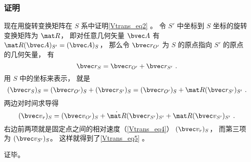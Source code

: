 \subsubsection{证明}
现在用旋转变换矩阵在 $S$ 系中证明\autoref{Vtrans_eq2} 。 令 $S'$ 中坐标到 $S$ 坐标的旋转变换矩阵为 $\mat R$， 即对任意几何矢量 $\bvec A$ 有 $\mat R (\bvec A)_{S'} = (\bvec A)_S$， 那么令 $\bvec r_{O'}$ 为 $S$ 的原点指向 $S'$ 的原点的几何矢量， 有
\begin{equation}
\bvec r_S = \bvec r_{O'} + \bvec r_{S'}~.
\end{equation}
用 $S$ 中的坐标来表示， 就是
\begin{equation}
(\bvec r_S)_S = (\bvec r_{O'})_S + (\bvec r_{S'})_S = (\bvec r_{O'})_S + \mat R(\bvec r_{S'})_{S'}~.
\end{equation}
两边对时间求导得
\begin{equation}
({\bvec v}_r)_S = ({\bvec v}_{O'})_S + \dot{\mat R}(\bvec r_{S'})_{S'} + \mat R ({\bvec v}_{S'})_{S'}~.
\end{equation}
右边前两项就是固定点之间的相对速度（\autoref{Vtrans_eq4}） $(\bvec v_r)_S$， 而第三项为 $(\bvec v_{S'})_S$。 这样就得到了\autoref{Vtrans_eq5} 。

证毕。
